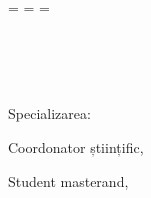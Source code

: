 \begin{titlepage}
  \oddsidemargin=\evensidemargin\relax
  \textwidth=\dimexpr{}\evensidemargin-2in\relax
  \hsize=\textwidth\relax

  \centering


  \vspace{5mm}
  {\LARGE{\getUniversity{}}}\\
  
  \vspace{5mm}
  {\LARGE{\getFaculty{}}}\\
  
  \vspace{5mm}
  {\LARGE{\getDepartment{}}}\\
  
  \vspace{5mm}
  \begin{flushleft}
  {\large Specializarea:}
  {\large{\getSpecialty{}}}\\
  \end{flushleft}
  
  \vfill
  {\huge\bfseries \getDoctype}

  \vspace{5mm}
  {\huge\bfseries \getTitle{}}

  \vfill
  \begin{flushleft}
  {\large Coordonator științific,}\\
  {\large \getAdvisor{}}
  \end{flushleft}

  \vspace{5mm}
  \begin{flushright}
  {\large Student masterand,}\\
  {\large \getAuthor{}}
  \end{flushright}


  \vfill
  {\huge{\getSubmissionLocation{}}}\\
  
  \vspace{5mm}
  {\huge\MakeUppercase{\getSubmissionDate}{}}\\

\end{titlepage}
